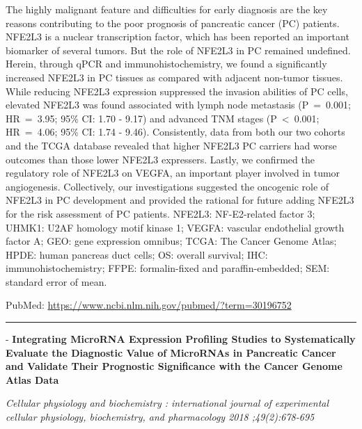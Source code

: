 \documentclass[]{article}
\begin{document}
The highly malignant feature and difficulties for early diagnosis are
the key reasons contributing to the poor prognosis of pancreatic cancer
(PC) patients. NFE2L3 is a nuclear transcription factor, which has been
reported an important biomarker of several tumors. But the role of
NFE2L3 in PC remained undefined. Herein, through qPCR and
immunohistochemistry, we found a significantly increased NFE2L3 in PC
tissues as compared with adjacent non-tumor tissues. While reducing
NFE2L3 expression suppressed the invasion abilities of PC cells,
elevated NFE2L3 was found associated with lymph node metastasis
(P~=~0.001; HR~=~3.95; 95\% CI: 1.70 - 9.17) and advanced TNM stages
(P~\textless{}~0.001; HR~=~4.06; 95\% CI: 1.74 - 9.46). Consistently,
data from both our two cohorts and the TCGA database revealed that
higher NFE2L3 PC carriers had worse outcomes than those lower NFE2L3
expressers. Lastly, we confirmed the regulatory role of NFE2L3 on VEGFA,
an important player involved in tumor angiogenesis. Collectively, our
investigations suggested the oncogenic role of NFE2L3 in PC development
and provided the rational for future adding NFE2L3 for the risk
assessment of PC patients. NFE2L3: NF-E2-related factor 3; UHMK1: U2AF
homology motif kinase 1; VEGFA: vascular endothelial growth factor A;
GEO: gene expression omnibus; TCGA: The Cancer Genome Atlas; HPDE: human
pancreas duct cells; OS: overall survival; IHC: immunohistochemistry;
FFPE: formalin-fixed and paraffin-embedded; SEM: standard error of mean.

PubMed: \url{https://www.ncbi.nlm.nih.gov/pubmed/?term=30196752}

{}

{}

\begin{center}\rule{0.5\linewidth}{\linethickness}\end{center}

 - \textbf{Integrating MicroRNA Expression Profiling Studies to
Systematically Evaluate the Diagnostic Value of MicroRNAs in Pancreatic
Cancer and Validate Their Prognostic Significance with the Cancer Genome
Atlas Data}

\emph{Cellular physiology and biochemistry : international journal of
experimental cellular physiology, biochemistry, and pharmacology 2018
;49(2):678-695}
\end{document}
